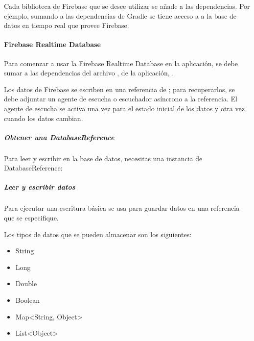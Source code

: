 Cada biblioteca de Firebase que se desee utilizar se añade a las dependencias.
Por ejemplo, sumando a las dependencias de Gradle  
se tiene acceso a a la base de datos en tiempo real que provee Firebase.


\paragraph{Firebase Realtime Database}
\label{\detokenize{dev_docs:firebase-realtime-database}}
Para comenzar a usar la Firebase Realtime Database en la aplicación,
se debe sumar a las dependencias del archivo , de la aplicación,
.

Los datos de Firebase se escriben en una referencia de ;
para recuperarlos, se debe adjuntar un agente de escucha o escuchador asíncrono a la
referencia. El agente de escucha se activa una vez para el estado inicial de los
datos y otra vez cuando los datos cambian.


\subparagraph{Obtener una DatabaseReference}
\label{\detokenize{dev_docs:obtener-una-databasereference}}
Para leer y escribir en la base de datos, necesitas una instancia de
DatabaseReference:

%
\begin{sphinxVerbatim}[commandchars=\\\{\}]
  
  
\end{sphinxVerbatim}


\subparagraph{Leer y escribir datos}
\label{\detokenize{dev_docs:leer-y-escribir-datos}}
Para ejecutar una escritura básica se usa  para guardar datos en
una referencia que se especifique.

Los tipos de datos que se pueden almacenar son los siguientes:
\begin{itemize}
\item {} 
String

\item {} 
Long

\item {} 
Double

\item {} 
Boolean

\item {} 
Map\textless{}String, Object\textgreater{}

\item {} 
List\textless{}Object\textgreater{}

\end{itemize}

